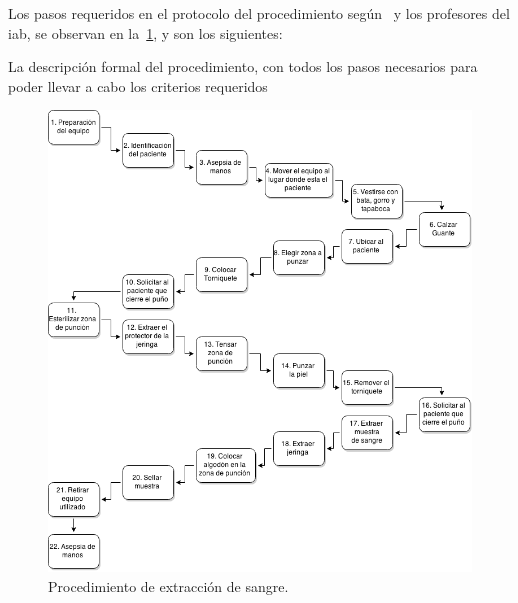Los pasos requeridos en el protocolo del procedimiento según~\cite{oms:extraccion}
y los profesores del \Gls{iab}, se observan en la~\ref{fig:proc_hemocultivo}, y
son los siguientes:

La descripción formal del procedimiento, con todos los pasos necesarios
para poder llevar a cabo los criterios requeridos 

\begin{figure}
\centering
\includegraphics[scale=0.5]{requerimientos/images/hemocultivo.png}
\caption{Procedimiento de extracción de sangre.}
\label{fig:proc_hemocultivo}
\end{figure}

